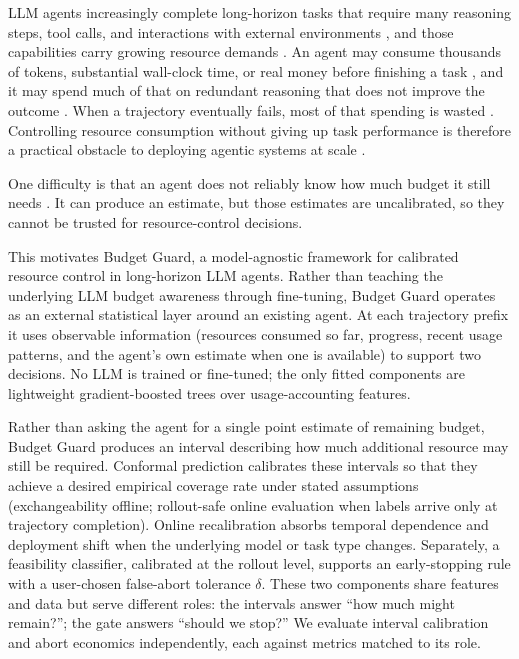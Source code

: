 \documentclass{article}
\newcommand{\bg}{Budget Guard}
\begin{document}
LLM agents increasingly complete long-horizon tasks that require many reasoning steps,
tool calls, and interactions with external environments \cite{kwa2025long}, and those
capabilities carry growing resource demands \cite{chen2026token}. An agent may consume
thousands of tokens, substantial wall-clock time, or real money before finishing a task
\cite{bai2026spend}, and it may spend much of that on redundant reasoning that does not
improve the outcome \cite{sui2025overthinking,wang2025reasoning,yue2025dontoverthink}.
When a trajectory eventually fails, most of that spending is wasted \cite{bai2026spend}.
Controlling resource consumption without giving up task performance is therefore a
practical obstacle to deploying agentic systems at scale
\cite{chen2024frugalgpt,zellinger2025cascades,davidov2026quit}.

One difficulty is that an agent does not reliably know how much budget it still needs
\cite{bai2026spend}. It can produce an estimate, but those estimates are uncalibrated,
so they cannot be trusted for resource-control decisions.

This motivates \bg, a model-agnostic framework for calibrated resource control in
long-horizon LLM agents. Rather than teaching the underlying LLM budget awareness
through fine-tuning, \bg{} operates as an external statistical layer around an existing
agent. At each trajectory prefix it uses observable information (resources consumed so
far, progress, recent usage patterns, and the agent's own estimate when one is
available) to support two decisions. No LLM is trained or fine-tuned; the only fitted
components are lightweight gradient-boosted trees over usage-accounting features.

Rather than asking the agent for a single point estimate of remaining budget, \bg{}
produces an interval describing how much additional resource may still be required.
Conformal prediction calibrates these intervals so that they achieve a desired
empirical coverage rate under stated assumptions (exchangeability offline; rollout-safe
online evaluation when labels arrive only at trajectory completion). Online
recalibration absorbs temporal dependence and deployment shift when the underlying
model or task type changes. Separately, a feasibility classifier, calibrated at the
rollout level, supports an early-stopping rule with a user-chosen false-abort tolerance
$\delta$. These two components share features and data but serve different roles: the
intervals answer ``how much might remain?''; the gate answers ``should we stop?'' We
evaluate interval calibration and abort economics independently, each against metrics
matched to its role.
\end{document}
